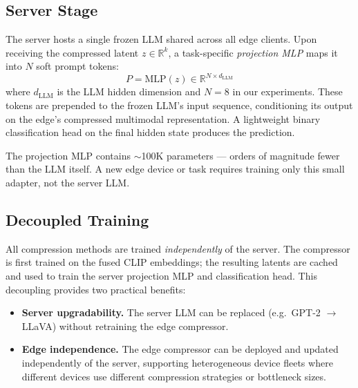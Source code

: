 \subsection{Server Stage}

The server hosts a single frozen LLM shared across all edge clients. Upon receiving the compressed latent $z \in \mathbb{R}^{k}$, a task-specific \emph{projection MLP} maps it into $N$ soft prompt tokens:
\begin{equation}
    P = \text{MLP}(z) \in \mathbb{R}^{N \times d_{\text{LLM}}}
\end{equation}
where $d_{\text{LLM}}$ is the LLM hidden dimension and $N{=}8$ in our experiments. These tokens are prepended to the frozen LLM's input sequence, conditioning its output on the edge's compressed multimodal representation. A lightweight binary classification head on the final hidden state produces the prediction.

The projection MLP contains $\sim$100K parameters — orders of magnitude fewer than the LLM itself. A new edge device or task requires training only this small adapter, not the server LLM.

\subsection{Decoupled Training}

All compression methods are trained \emph{independently} of the server. The compressor is first trained on the fused CLIP embeddings; the resulting latents are cached and used to train the server projection MLP and classification head. This decoupling provides two practical benefits:

\begin{itemize}
    \item \textbf{Server upgradability.} The server LLM can be replaced (e.g.\ GPT-2 $\to$ LLaVA) without retraining the edge compressor.
    \item \textbf{Edge independence.} The edge compressor can be deployed and updated independently of the server, supporting heterogeneous device fleets where different devices use different compression strategies or bottleneck sizes.
\end{itemize}
